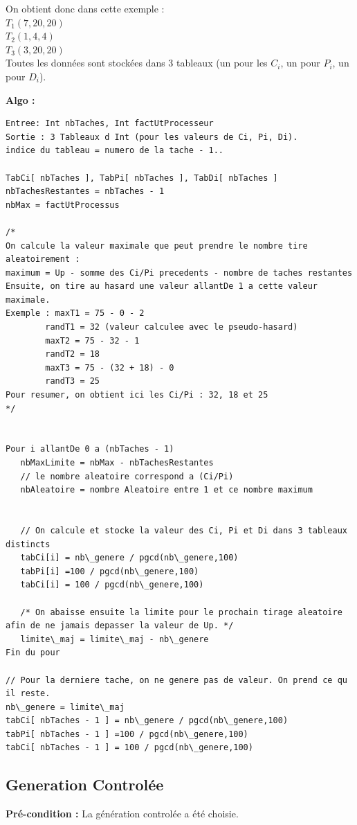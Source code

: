 		    On obtient donc dans cette exemple :  \\
		    $T_1(7,20,20)$ \\
		    $T_2(1,4,4)$ \\
		    $T_3(3,20,20)$ \\

		    Toutes les données sont stockées dans 3 tableaux (un pour les $C_i$, un pour $P_i$, un pour $D_i$). 

			\textbf{Algo :}
			\begin{lstlisting}
Entree: Int nbTaches, Int factUtProcesseur
Sortie : 3 Tableaux d Int (pour les valeurs de Ci, Pi, Di). 
indice du tableau = numero de la tache - 1..

TabCi[ nbTaches ], TabPi[ nbTaches ], TabDi[ nbTaches ]
nbTachesRestantes = nbTaches - 1
nbMax = factUtProcessus 

/*
On calcule la valeur maximale que peut prendre le nombre tire aleatoirement :
maximum = Up - somme des Ci/Pi precedents - nombre de taches restantes
Ensuite, on tire au hasard une valeur allantDe 1 a cette valeur maximale.
Exemple : maxT1 = 75 - 0 - 2
	    randT1 = 32 (valeur calculee avec le pseudo-hasard)
	    maxT2 = 75 - 32 - 1
	    randT2 = 18
	    maxT3 = 75 - (32 + 18) - 0
	    randT3 = 25
Pour resumer, on obtient ici les Ci/Pi : 32, 18 et 25
*/


Pour i allantDe 0 a (nbTaches - 1)
   nbMaxLimite = nbMax - nbTachesRestantes
   // le nombre aleatoire correspond a (Ci/Pi)
   nbAleatoire = nombre Aleatoire entre 1 et ce nombre maximum


   // On calcule et stocke la valeur des Ci, Pi et Di dans 3 tableaux distincts
   tabCi[i] = nb\_genere / pgcd(nb\_genere,100)
   tabPi[i] =100 / pgcd(nb\_genere,100)
   tabCi[i] = 100 / pgcd(nb\_genere,100)
	        
   /* On abaisse ensuite la limite pour le prochain tirage aleatoire afin de ne jamais depasser la valeur de Up. */
   limite\_maj = limite\_maj - nb\_genere
Fin du pour

// Pour la derniere tache, on ne genere pas de valeur. On prend ce qu il reste.
nb\_genere = limite\_maj
tabCi[ nbTaches - 1 ] = nb\_genere / pgcd(nb\_genere,100)
tabPi[ nbTaches - 1 ] =100 / pgcd(nb\_genere,100)
tabCi[ nbTaches - 1 ] = 100 / pgcd(nb\_genere,100)
			\end{lstlisting}

		\subsection{Generation Controlée}  
			\textbf{Pré-condition :} La génération controlée a été choisie.
		
